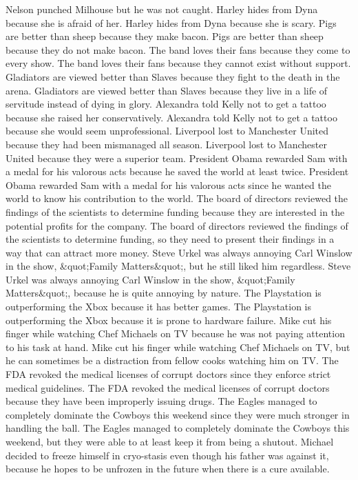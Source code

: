 \documentclass{article}
\begin{document}
\begin{enumerate}
	Nelson punched Milhouse but he was not caught.
	Harley hides from Dyna because she is afraid of her.
	Harley hides from Dyna because she is scary.
	Pigs are better than sheep because they make bacon.
	Pigs are better than sheep because they do not make bacon.
	The band loves their fans because they come to every show.
	The band loves their fans because they cannot exist without support.
	Gladiators are viewed better than Slaves because they fight to the death in the arena.
	Gladiators are viewed better than Slaves because they live in a life of servitude instead of dying in glory.
	Alexandra told Kelly not to get a tattoo because she raised her conservatively.
	Alexandra told Kelly not to get a tattoo because she would seem unprofessional.
	Liverpool lost to Manchester United because they had been mismanaged all season.
	Liverpool lost to Manchester United because they were a superior team.
	President Obama rewarded Sam with a medal for his valorous acts because he saved the world at least twice.
	President Obama rewarded Sam with a medal for his valorous acts since he wanted the world to know his contribution to the world.
	The board of directors reviewed the findings of the scientists to determine funding because they are interested in the potential profits for the company.
	The board of directors reviewed the findings of the scientists to determine funding, so they need to present their findings in a way that can attract more money.
	Steve Urkel was always annoying Carl Winslow in the show, &quot;Family Matters&quot;, but he still liked him regardless.
	Steve Urkel was always annoying Carl Winslow in the show, &quot;Family Matters&quot;, because he is quite annoying by nature.
	The Playstation is outperforming the Xbox because it has better games.
	The Playstation is outperforming the Xbox because it is prone to hardware failure.
	Mike cut his finger while watching Chef Michaels on TV because he was not paying attention to his task at hand.
	Mike cut his finger while watching Chef Michaels on TV, but he can sometimes be a distraction from fellow cooks watching him on TV.
	The FDA revoked the medical licenses of corrupt doctors since they enforce strict medical guidelines.
	The FDA revoked the medical licenses of corrupt doctors because they have been improperly issuing drugs.
	The Eagles managed to completely dominate the Cowboys this weekend since they were much stronger in handling the ball.
	The Eagles managed to completely dominate the Cowboys this weekend, but they were able to at least keep it from being a shutout.
	Michael decided to freeze himself in cryo-stasis even though his father was against it, because he hopes to be unfrozen in the future when there is a cure available.

\end{enumerate}
\end{document}
